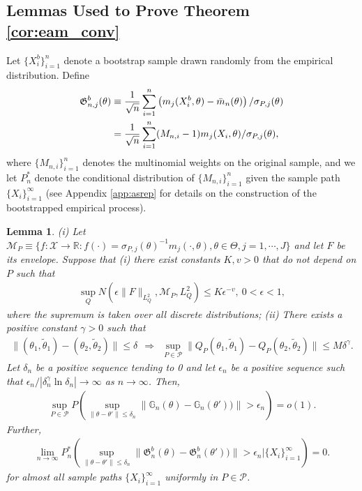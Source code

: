 \documentclass[letterpaper,11pt]{article}
\theoremstyle{myplain}
\newtheorem{lemma}{Lemma}[section]
\theoremstyle{mydefinition}
\theoremstyle{myremark}
\numberwithin{equation}{section}
\numberwithin{figure}{section}
\begin{document}
\begin{appendices}
\subsection{Lemmas Used to Prove Theorem \ref{cor:eam_conv}}\label{sec:Lemmas_for_EAM}
Let $\{X_i^b\}_{i=1}^n$ denote a bootstrap sample drawn randomly from the empirical distribution.
Define
\begin{align}
	\mathfrak G^b_{n,j}(\theta)&\equiv \frac{1}{\sqrt n}\sum_{i=1}^n \left( m_j(X_i^b,\theta)-\bar m_n(\theta) \right)/\sigma_{P,j}(\theta)\notag\\
	&=\frac{1}{\sqrt n}\sum_{i=1}^n(M_{n,i}-1)m_j(X_i,\theta)/\sigma_{P,j}(\theta),
\end{align}
where $\{M_{n,i}\}_{i=1}^n$ denotes the multinomial weights on the original sample, and we let
 $P^*_n$ denote the conditional distribution of $\{M_{n,i}\}_{i=1}^n$ given the sample path $\{X_i\}_{i=1}^\infty$ (see Appendix \ref{app:asrep} for details on the construction of the bootstrapped empirical process).

\begin{lemma}\label{lem:se_rate}
	(i) Let $\mathcal M_P\equiv\{f:\mathcal X\to\mathbb R:f(\cdot)=\sigma_{P,j}(\theta)^{-1}m_j(\cdot,\theta),\theta\in\Theta,j=1,\cdots,J\}$ and let $F$ be its envelope. Suppose that (i) there exist constants $K,v>0$ that do not depend on $P$ such that
	\begin{align}
	\sup_Q N(\epsilon\|F\|_{L^2_Q},\mathcal M_P,L^2_Q)\le K\epsilon^{-v}	,~0<\epsilon<1,\label{eq:as_euclidean}
	\end{align}
	where the supremum is taken over all discrete distributions; (ii) There exists a positive constant $\gamma>0$ such that 
	\begin{align}
	\|(\theta_1,\tilde\theta_1)-(\theta_2,\tilde\theta_2)\|\le\delta~~\Rightarrow~~\sup_{P\in\mathcal P}\|Q_P(\theta_1,\tilde\theta_1)-Q_P(\theta_2,\tilde\theta_2)\|\le M\delta^\gamma.\label{eq:correl_holder}
	\end{align}
	Let $\delta_n$ be a positive sequence tending to 0 and let $\epsilon_n$ be a positive sequence such that $\epsilon_n/|\delta_n^\gamma\ln\delta_n|\to\infty$ as $n\to\infty$.
		Then, \begin{align}
\sup_{P\in\mathcal P}P\left(\sup_{\|\theta-\theta'\|\le \delta_n}\|\mathbb G_n(\theta)-\mathbb G_n(\theta'))\|>\epsilon_n \right)=o(1).\label{eq:sr1}
\end{align}
Further,
\begin{align}
\lim_{n\to\infty}P^*_n \left(\sup_{\|\theta-\theta'\|\le \delta_n}\|\mathfrak G^b_{n}(\theta)-\mathfrak G^b_{n}(\theta'))\|>\epsilon_n|\{X_i\}_{i=1}^\infty \right)=0.	
\end{align}
for almost all sample paths $\{X_i\}_{i=1}^\infty$ uniformly in $P\in \mathcal P$.
\end{lemma}


\end{appendices}
\end{document}
